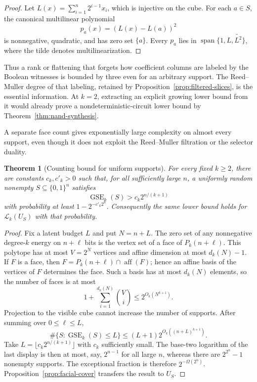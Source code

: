 \documentclass{article}
\newcommand{\LC}{\mathcal{L}}
\newcommand{\GSE}{\operatorname{GSE}}
\newcommand{\bits}{\{0,1\}}
\newtheorem{theorem}{Theorem}
\begin{document}
\begin{proof}
Let $L(x)=\sum_{i=1}^n2^{i-1}x_i$, which is injective on the cube.  For each
$a\in S$, the canonical multilinear polynomial
\[
  p_a(x)=(L(x)-L(a))^2
\]
is nonnegative, quadratic, and has zero set $\{a\}$.  Every $p_a$ lies in
$\operatorname{span}\{1,L,\widetilde{L^2}\}$, where the tilde denotes
multilinearization.
\end{proof}

Thus a rank or flattening that forgets how coefficient columns are labeled by
the Boolean witnesses is bounded by three even for an arbitrary support.  The
Reed--Muller degree of that labeling, retained by
Proposition~\ref{prop:filtered-slices}, is the essential information.  At
$k=2$, extracting an explicit growing lower bound from it would already prove
a nondeterministic-circuit lower bound by Theorem~\ref{thm:nand-synthesis}.

A separate face count gives exponentially large complexity on almost every
support, even though it does not exploit the Reed--Muller filtration or the
selector duality.

\begin{theorem}[Counting bound for uniform supports]
\label{thm:random-support}
For every fixed $k\ge2$, there are constants $c_k,c'_k>0$ such that, for all
sufficiently large $n$, a uniformly random nonempty
$S\subseteq\bits^n$ satisfies
\[
  \GSE_k(S)>c_k2^{n/(k+1)}
\]
with probability at least $1-2^{-c'_k2^n}$.  Consequently the same lower bound
holds for $\LC_k(U_S)$ with that probability.
\end{theorem}

\begin{proof}
Fix a latent budget $L$ and put $N=n+L$.  The zero set of any nonnegative
degree-$k$ energy on $n+\ell$ bits is the vertex set of a face of
$P_k(n+\ell)$.  This polytope has at most $V=2^N$ vertices and affine dimension
at most $d_k(N)-1$.  If $F$ is a face, then
$F=P_k(n+\ell)\cap\operatorname{aff}(F)$; hence an affine basis of the vertices
of $F$ determines the face.  Such a basis has at most $d_k(N)$ elements, so
the number of faces is at most
\[
  1+\sum_{i=1}^{d_k(N)}\binom Vi
  \le 2^{O_k(N^{k+1})}.
\]
Projection to the visible cube cannot increase the number of supports.  After
summing over $0\le\ell\le L$,
\[
  \#\{S:\GSE_k(S)\le L\}
  \le (L+1)2^{O_k((n+L)^{k+1})}.
\]
Take $L=\lfloor c_k2^{n/(k+1)}\rfloor$ with $c_k$ sufficiently small.  The
base-two logarithm of the last display is then at most, say, $2^{n-1}$ for all
large $n$, whereas there are $2^{2^n}-1$ nonempty supports.  The exceptional
fraction is therefore $2^{-\Omega(2^n)}$.  Proposition~\ref{prop:facial-cover}
transfers the result to $U_S$.
\end{proof}
\end{document}
